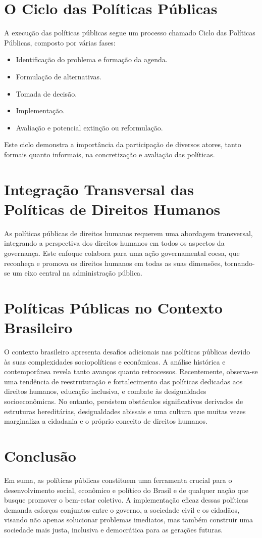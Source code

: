 \documentclass[
   article,       
   12pt,          
   oneside,       
   a4paper,       
   english,       
   brazil,        
   sumario=tradicional
   ]{abntex2}
\begin{document}
\section{O Ciclo das Políticas Públicas}
A execução das políticas públicas segue um processo chamado Ciclo das Políticas Públicas, composto por várias fases:
\begin{itemize}
    \item Identificação do problema e formação da agenda.
    \item Formulação de alternativas.
    \item Tomada de decisão.
    \item Implementação.
    \item Avaliação e potencial extinção ou reformulação.
\end{itemize}
Este ciclo demonstra a importância da participação de diversos atores, tanto formais quanto informais, na concretização e avaliação das políticas.

\section{Integração Transversal das Políticas de Direitos Humanos}
As políticas públicas de direitos humanos requerem uma abordagem transversal, integrando a perspectiva dos direitos humanos em todos os aspectos da governança. Este enfoque colabora para uma ação governamental coesa, que reconheça e promova os direitos humanos em todas as suas dimensões, tornando-se um eixo central na administração pública.

\section{Políticas Públicas no Contexto Brasileiro}
O contexto brasileiro apresenta desafios adicionais nas políticas públicas devido às suas complexidades sociopolíticas e econômicas. A análise histórica e contemporânea revela tanto avanços quanto retrocessos. Recentemente, observa-se uma tendência de reestruturação e fortalecimento das políticas dedicadas aos direitos humanos, educação inclusiva, e combate às desigualdades socioeconômicas. No entanto, persistem obstáculos significativos derivados de estruturas hereditárias, desigualdades abissais e uma cultura que muitas vezes marginaliza a cidadania e o próprio conceito de direitos humanos.

\section{Conclusão}
Em suma, as políticas públicas constituem uma ferramenta crucial para o desenvolvimento social, econômico e político do Brasil e de qualquer nação que busque promover o bem-estar coletivo. A implementação eficaz dessas políticas demanda esforços conjuntos entre o governo, a sociedade civil e os cidadãos, visando não apenas solucionar problemas imediatos, mas também construir uma sociedade mais justa, inclusiva e democrática para as gerações futuras.
\end{document}
